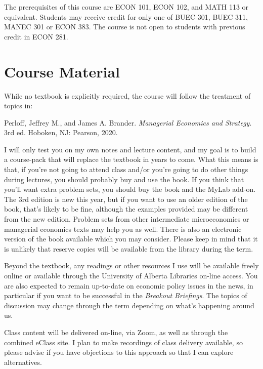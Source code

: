 \documentclass[11pt,]{article}
\begin{document}
The prerequisites of this course are ECON 101, ECON 102, and MATH 113 or
equivalent. Students may receive credit for only one of BUEC 301, BUEC
311, MANEC 301 or ECON 383. The course is not open to students with
previous credit in ECON 281.

\hypertarget{course-material}{%
\section{Course Material}\label{course-material}}

While no textbook is explicitly required, the course will follow the
treatment of topics in:

\begin{center}
\begin{minipage}{.8\linewidth}
Perloff, Jeffrey M., and James A. Brander. \textit{Managerial Economics and Strategy}. 3rd ed. Hoboken, NJ: Pearson, 2020.
\end{minipage}
\end{center}

I will only test you on my own notes and lecture content, and my goal is
to build a course-pack that will replace the textbook in years to come.
What this means is that, if you're not going to attend class and/or
you're going to do other things during lectures, you should probably buy
and use the book. If you think that you'll want extra problem sets, you
should buy the book and the MyLab add-on. The 3rd edition is new this
year, but if you want to use an older edition of the book, that's likely
to be fine, although the examples provided may be different from the new
edition. Problem sets from other intermediate microeconomics or
managerial economics texts may help you as well. There is also an
electronic version of the book available which you may consider. Please
keep in mind that it is unlikely that reserve copies will be available
from the library during the term.

Beyond the textbook, any readings or other resources I use will be
available freely online or available through the University of Alberta
Libraries on-line access. You are also expected to remain up-to-date on
economic policy issues in the news, in particular if you want to be
successful in the \textit{Breakout Briefings}. The topics of discussion
may change through the term depending on what's happening around us.

Class content will be delivered on-line, via Zoom, as well as through
the combined eClass site. I plan to make recordings of class delivery
available, so please advise if you have objections to this approach so
that I can explore alternatives.
\end{document}
